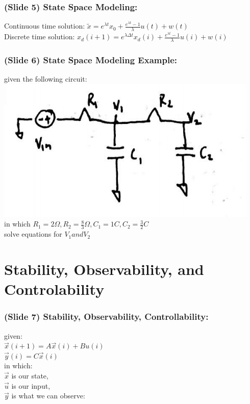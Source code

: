 \documentclass{beamer}
\begin{document}
\begin{frame}
\frametitle{(Slide 5) State Space Modeling:}

Continuous time solution: 
$\tilde{x} = e^{\lambda t} x_{0} + \frac{e^{\lambda t} - 1}{\lambda } u(t) + w(t)$\\

Discrete time solution:
$x_{d}(i+1) = e^{\lambda \Delta t} x_{d}(i) + \frac{e^{\lambda t} - 1}{\lambda } u(i) + w(i)$\\
\end{frame}

\begin{frame}
\frametitle{(Slide 6) State Space Modeling Example:}

given the following circuit: \\
\includegraphics[scale=0.5]{./images/circuit.png} \\
in which $R_{1} = 2 \Omega, R_{2} = \frac{8}{3} \Omega, C_{1} = 1 C, C_{2} = \frac{3}{2} C$ \\
solve equations for $V_{1} and V_{2}$
\end{frame}

\section[S,O,\&C]{Stability, Observability, and Controlability}

\begin{frame}
\frametitle{(Slide 7) Stability, Observability, Controllability:}

given: \\ 
$\vec{x}(i+1) = A\vec{x}(i) + Bu(i)$ \\
$\vec{y}(i) = C\vec{x}(i)$ \\
in which: \\
$\vec{x}$ is our state, \\
$\vec{u}$ is our input, \\
$\vec{y}$ is what we can observe: \\
\end{frame}
\end{document}
